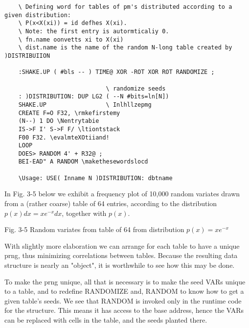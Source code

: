 \begin{verbatim}
	\ Defining word for tables of pm's distributed according to a given distribution:
	\ P(x<X(xi)) = id defhes X(xi).
	\ Note: the first entry is autormticaliy 0.  
	\ fn.name oonvetts xi to X(xi) 
	\ dist.name is the name of the random N-long table created by )DISTRIBUIION

	:SHAKE.UP ( #bls -- ) TIME@ XOR -ROT XOR ROT RANDOMIZE ;

							 \ randomize seeds
	: )DISTRIBUTION: DUP LG2 ( --N #bits=ln[N])
	SHAKE.UP                 \ Inlhllzepmg
	CREATE F=O F32, \rmkefirstemy
	(N--) 1 DO \Nentrytabie
	IS->F I' S->F F/ \ltiontstack
	F00 F32. \evalmteXOtiiand!
	LOOP
	DOES> RANDOM 4' + R32@ ;
	BEI-EAD" A RANDOM \makethesewordslocd

	\Usage: USE( Inname N )DISTRIBUTION: dbtname
\end{verbatim}
In Fig. 3-5 below we exhibit a frequency plot of 10,000 random
variates drawn from a (rather coarse) table of 64 entries, according to the
distribution $p(x)dx=xe^{-x}dx$, together with $p(x)$.

 


 

 

 

 

 

 

 

 

 

 

 

 

Fig. 3-5 Random variates from table of 64 from distribution $p(x)=xe^{-x}$

With slightly more elaboration we can arrange for each table to 
have a unique prng, thus minimizing correlations between
tables. Because the resulting data structure is nearly an "object",
it is worthwhile to see how this may be done.

To make the prng unique, all that is necessary is to make the seed
VARs unique to a table, and to redefine RANDOMIZE and,
RANDOM to know how to get a given table’s seeds. We see that
RANDOM is invoked only in the runtime code for the structure.
This means it has access to the base address, hence the VARs
can be replaced with cells in the table, and the seeds planted there.

